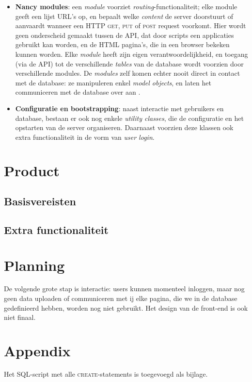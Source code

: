 \documentclass[12pt,a4paper]{article}
\begin{document}
\begin{itemize}
\item \textbf{Nancy modules}: een \emph{module} voorziet \emph{routing}-functionaliteit; elke module geeft een lijst URL's op, en bepaalt welke \emph{content} de server doorstuurt of aanvaardt wanneer een HTTP \textsc{get}, \textsc{put} of \textsc{post} request voorkomt. Hier wordt geen onderscheid gemaakt tussen de API, dat door scripts een applicaties gebruikt kan worden, en de HTML pagina's, die in een browser bekeken kunnen worden. Elke \emph{module} heeft zijn eigen verantwoordelijkheid, en toegang (via de API) tot de verschillende \emph{tables} van de database wordt voorzien door verschillende modules. De \emph{modules} zelf komen echter nooit direct in contact met de database: ze manipuleren enkel \emph{model objects}, en laten het communiceren met de database over aan .

\item \textbf{Configuratie en bootstrapping}: naast interactie met gebruikers en database, bestaan er ook nog enkele \emph{utility classes}, die de configuratie en het opstarten van de server organiseren. Daarnaast voorzien deze klassen ook extra functionaliteit in de vorm van \emph{user login}. 

\end{itemize}

\section{Product}

\subsection{Basisvereisten}

\subsection{Extra functionaliteit}

\section{Planning}
De volgende grote stap is interactie: users kunnen momenteel inloggen, maar nog
geen data uploaden of communiceren met ij elke pagina, 
die we in de database gedefinieerd hebben, worden nog niet gebruikt. Het design 
van de front-end is ook niet finaal.

\section{Appendix}
Het SQL-script met alle \textsc{create}-statements is toegevoegd als bijlage.
\end{document}
